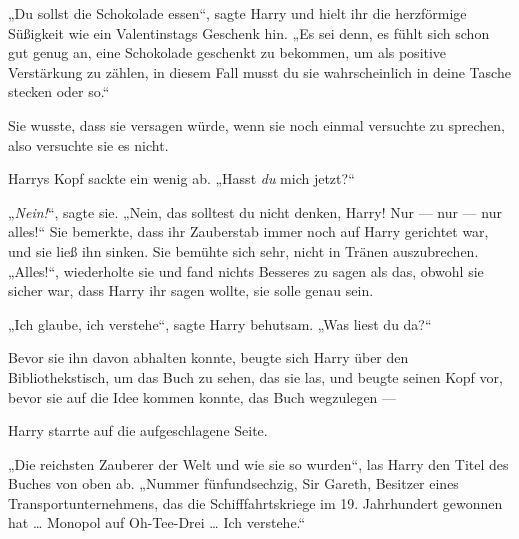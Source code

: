 „Du sollst die Schokolade essen“, sagte Harry und hielt ihr die herzförmige Süßigkeit wie ein Valentinstags Geschenk hin.
„Es sei denn, es fühlt sich schon gut genug an, eine Schokolade geschenkt zu bekommen, um als positive Verstärkung zu zählen, in diesem Fall musst du sie wahrscheinlich in deine Tasche stecken oder so.“

Sie wusste, dass sie versagen würde, wenn sie noch einmal versuchte zu sprechen, also versuchte sie es nicht.

Harrys Kopf sackte ein wenig ab.
„Hasst \emph{du} mich jetzt?“

„\emph{Nein!}“, sagte sie.
„Nein, das solltest du nicht denken, Harry! Nur — nur — nur alles!“ Sie bemerkte, dass ihr Zauberstab immer noch auf Harry gerichtet war, und sie ließ ihn sinken. Sie bemühte sich sehr, nicht in Tränen auszubrechen.
„Alles!“, wiederholte sie und fand nichts Besseres zu sagen als das, obwohl sie sicher war, dass Harry ihr sagen wollte, sie solle genau sein.

„Ich glaube, ich verstehe“, sagte Harry behutsam.
„Was liest du da?“

Bevor sie ihn davon abhalten konnte, beugte sich Harry über den Bibliothekstisch, um das Buch zu sehen, das sie las, und beugte seinen Kopf vor, bevor sie auf die Idee kommen konnte, das Buch wegzulegen —

Harry starrte auf die aufgeschlagene Seite.

„Die reichsten Zauberer der Welt und wie sie so wurden“, las Harry den Titel des Buches von oben ab.
„Nummer fünfundsechzig, Sir Gareth, Besitzer eines Transportunternehmens, das die Schifffahrtskriege im 19. Jahrhundert gewonnen hat … Monopol auf Oh-Tee-Drei … Ich verstehe.“

